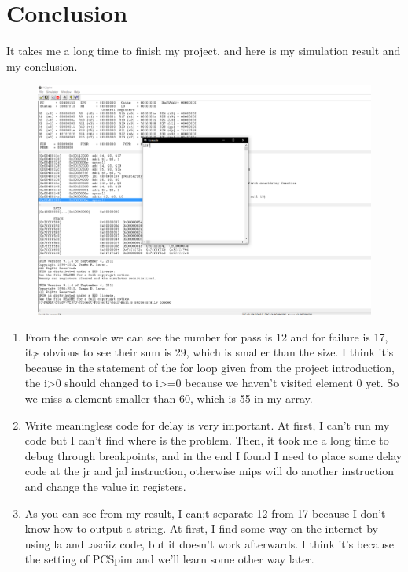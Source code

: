 \documentclass[12pt]{article}
\begin{document}
\section{Conclusion}
It takes me a long time to finish my project, and here is my simulation result and my conclusion.
\begin{figure}[H]
\centering
\includegraphics[scale=0.3]{PCSpim.png}
\end{figure}
\begin{enumerate}
\item From the console we can see the number for pass is 12 and for failure is 17, it;s obvious to see their sum is 29, which is smaller than the size. I think it's because in the statement of the for loop given from the project introduction, the i>0 should changed to i>=0 because we haven't visited element 0 yet. So we miss a element smaller than 60, which is 55 in my array.
\item Write meaningless code for delay is very important. At first, I can't run my code but I can't find where is the problem. Then, it took me a long time to debug through breakpoints, and in the end I found I need to place some delay code at the jr and jal instruction, otherwise mips will do another instruction and change the value in registers.
\item As you can see from my result, I can;t separate 12 from 17 because I don't know how to output a string. At first, I find some way on the internet by using la and .asciiz code, but it doesn't work afterwards. I think it's because the setting of PCSpim and we'll learn some other way later.
\end{enumerate}
\end{document}
